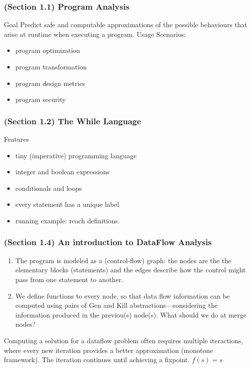 \begin{frame}
  \frametitle{(Section 1.1) Program Analysis}

  \begin{block}{Goal}
    Predict {\color{blue}safe} and {\color{blue}computable approximations} of the possible
    behaviours that arise at runtime when executing a program. \pause
    Usage Scenarios:
    \begin{itemize}
     \item program optimization
     \item program transformation
     \item program design metrics
     \item program security
    \end{itemize}
  \end{block}
\end{frame}

\begin{frame}
  \frametitle{(Section 1.2) The While Language}

  \begin{block}{Features}
    \begin{itemize}
     \item tiny (imperative) programming language
     \item integer and boolean expressions  
     \item conditionals and loops \pause
     \item every statement has a unique label  
    \end{itemize}
  \end{block}

  \begin{itemize}
    \item running example: reach definitions. 
  \end{itemize}
\end{frame}

\begin{frame}
  \frametitle{(Section 1.4) An introduction to DataFlow Analysis}

  \begin{enumerate}
    \item The program is modeled as a (control-flow) graph: the nodes are the
  the elementary blocks (statements) and the edges describe how the
  control might pass from one statement to another.

    \item We define functions to every node, so that data flow information
      can be computed using pairs of Gen and Kill abstractions---considering the
      information produced in the previou(s) node(s). What should we do
      at merge nodes?
  \end{enumerate}

  \pause Computing a solution for a dataflow problem often
  requires multiple iteractions, where every new iteration
  provides a better approximation (monotone framework).
  The iteration continues until achieving a {\color{blue}fixpoint}.
  \pause $f(s) = s$
  
\end{frame}

